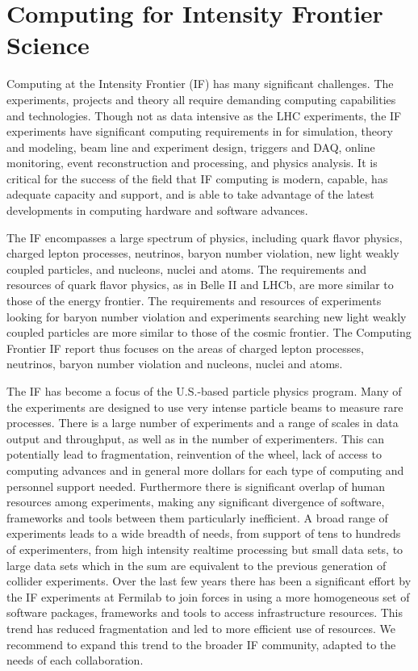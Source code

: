 \section{Computing for Intensity Frontier Science}

Computing at the Intensity Frontier (IF) has many significant challenges. The
experiments, projects and theory all require demanding computing capabilities
and technologies.  Though not as data intensive as the LHC experiments, the IF
experiments have significant computing requirements in for simulation,  theory
and modeling, beam line and experiment design, triggers and DAQ, online
monitoring, event reconstruction and processing, and physics analysis.  It is
critical for the success of the field that IF computing is modern, capable,
has adequate capacity and support, and is able to take advantage of the latest
developments in computing hardware and software advances.

The IF encompasses a large spectrum of physics, including quark flavor
physics,  charged lepton processes, neutrinos, baryon number violation,  new
light weakly coupled particles, and nucleons, nuclei and atoms.  The
requirements and resources of quark flavor physics, as in Belle II and LHCb,
are more similar to those of the energy frontier. The requirements and
resources of  experiments looking for baryon number violation and  experiments
searching new light weakly coupled particles are more similar to  those of the
cosmic frontier.  The Computing Frontier IF report thus focuses on the areas
of charged lepton processes,  neutrinos, baryon number violation and nucleons,
nuclei and atoms.

The IF has become a focus of the U.S.-based particle physics program. Many  of
the experiments are designed to use very intense particle beams to measure
rare processes. There is a large number of experiments and a range of scales
in data output and throughput, as well as in the number of experimenters.  This
can potentially lead to fragmentation, reinvention of the wheel, lack of
access to computing advances and in general more dollars for each type of
computing and personnel support needed. Furthermore there is significant
overlap of human resources among experiments, making any significant
divergence of  software, frameworks and tools between them particularly
inefficient.  A broad range of experiments leads to a wide breadth of needs,
from support of tens to hundreds of experimenters, from high intensity
realtime processing but small data sets, to large data sets which in the sum
are equivalent to the previous generation of collider experiments. Over the
last few years there has been a significant effort by the IF experiments at
Fermilab to join forces in using a more homogeneous set of software packages,
frameworks and tools to access infrastructure resources. This trend has
reduced fragmentation and led to more efficient use of resources. We recommend
to expand this trend to the broader IF community, adapted to the needs of each
collaboration.

